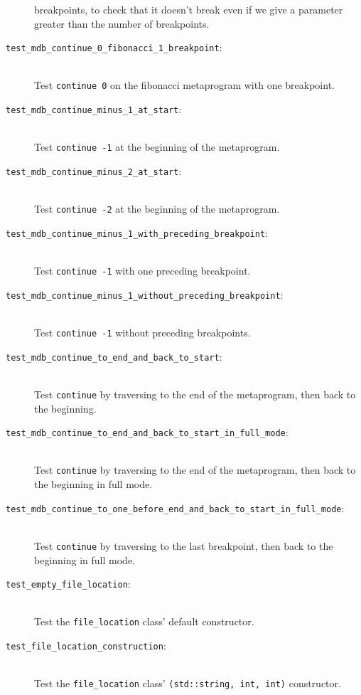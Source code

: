 \begin{description}
        breakpoints, to check that it doesn't break even if we give a
        parameter greater than the number of breakpoints.
    \item[\texttt{test\_mdb\_continue\_0\_fibonacci\_1\_breakpoint}:] \hfill \\
        Test \texttt{continue 0} on the fibonacci metaprogram with one
        breakpoint.
    \item[\texttt{test\_mdb\_continue\_minus\_1\_at\_start}:] \hfill \\
        Test \texttt{continue -1} at the beginning of the metaprogram.
    \item[\texttt{test\_mdb\_continue\_minus\_2\_at\_start}:] \hfill \\
        Test \texttt{continue -2} at the beginning of the metaprogram.
    \item[\texttt{test\_mdb\_continue\_minus\_1\_with\_preceding\_breakpoint}:] \hfill \\
        Test \texttt{continue -1} with one preceding breakpoint.
    \item[\texttt{test\_mdb\_continue\_minus\_1\_without\_preceding\_breakpoint}:] \hfill \\
        Test \texttt{continue -1} without preceding breakpoints.
    \item[\texttt{test\_mdb\_continue\_to\_end\_and\_back\_to\_start}:] \hfill \\
        Test \texttt{continue} by traversing to the end of the metaprogram,
        then back to the beginning.
    \item[\texttt{test\_mdb\_continue\_to\_end\_and\_back\_to\_start\_in\_full\_mode}:] \hfill \\
        Test \texttt{continue} by traversing to the end of the metaprogram,
        then back to the beginning in full mode.
    \item[\texttt{test\_mdb\_continue\_to\_one\_before\_end\_and\_back\_to\_start\_in\_full\_mode}:] \hfill \\
        Test \texttt{continue} by traversing to the last breakpoint, then back
        to the beginning in full mode.
    \item[\texttt{test\_empty\_file\_location}:] \hfill \\
        Test the \texttt{file\_location} class' default constructor.
    \item[\texttt{test\_file\_location\_construction}:] \hfill \\
        Test the \texttt{file\_location} class'
        \texttt{(std::string, int, int)} constructor.

\end{description}
